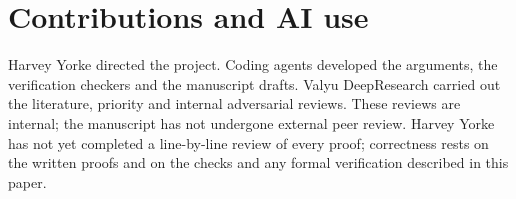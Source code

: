 \section*{Contributions and AI use}
Harvey Yorke directed the project. Coding agents developed the arguments, the verification checkers and the manuscript drafts. Valyu DeepResearch carried out the literature, priority and internal adversarial reviews. These reviews are internal; the manuscript has not undergone external peer review. Harvey Yorke has not yet completed a line-by-line review of every proof; correctness rests on the written proofs and on the checks and any formal verification described in this paper.
